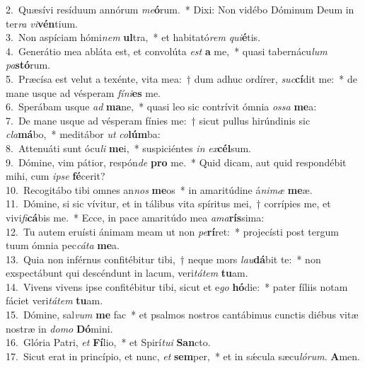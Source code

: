 {2.~}Quæsívi resíduum annórum \textit{me}\textbf{ó}rum.~* Dixi: Non vidébo Dóminum Deum in ter\textit{ra} \textit{vi}\textbf{vén}tium.\\
{3.~}Non aspíciam hómi\textit{nem} \textbf{ul}tra,~* et habitató\textit{rem} \textit{qui}\textbf{é}tis.\\
{4.~}Generátio mea abláta est, et convolúta \textit{est} \textbf{a} me,~* quasi tabernácu\textit{lum} \textit{pa}\textbf{stó}rum.\\
{5.~}Præcísa est velut a texénte, vita mea:~† dum adhuc ordírer, \textit{suc}\textbf{cí}dit me:~* de mane usque ad vésperam \textit{fí}\textit{ni}\textbf{es} me.\\
{6.~}Sperábam usque \textit{ad} \textbf{ma}ne,~* quasi leo sic contrívit ómnia \textit{os}\textit{sa} \textbf{me}a:\\
{7.~}De mane usque ad vésperam fínies me:~† sicut pullus hirúndinis sic \textit{cla}\textbf{má}bo,~* meditábor \textit{ut} \textit{co}\textbf{lúm}ba:\\
{8.~}Attenuáti sunt ócu\textit{li} \textbf{me}i,~* suspiciéntes \textit{in} \textit{ex}\textbf{cél}sum.\\
{9.~}Dómine, vim pátior, respón\textit{de} \textbf{pro} me.~* Quid dicam, aut quid respondébit mihi, cum \textit{i}\textit{pse} \textbf{fé}cerit?\\
{10.~}Recogitábo tibi omnes an\textit{nos} \textbf{me}os~* in amaritúdine á\textit{ni}\textit{mæ} \textbf{me}æ.\\
{11.~}Dómine, si sic vívitur, et in tálibus vita spíritus mei,~† corrípies me, et vivi\textit{fi}\textbf{cá}bis me.~* Ecce, in pace amaritúdo mea \textit{a}\textit{ma}\textbf{rís}sima:\\
{12.~}Tu autem eruísti ánimam meam ut non \textit{pe}\textbf{rí}ret:~* projecísti post tergum tuum ómnia pec\textit{cá}\textit{ta} \textbf{me}a.\\
{13.~}Quia non inférnus confitébitur tibi,~† neque mors \textit{lau}\textbf{dá}bit te:~* non exspectábunt qui descéndunt in lacum, veri\textit{tá}\textit{tem} \textbf{tu}am.\\
{14.~}Vivens vivens ipse confitébitur tibi, sicut et e\textit{go} \textbf{hó}die:~* pater fíliis notam fáciet veri\textit{tá}\textit{tem} \textbf{tu}am.\\
{15.~}Dómine, sal\textit{vum} \textbf{me} fac~* et psalmos nostros cantábimus cunctis diébus vitæ nostræ in \textit{do}\textit{mo} \textbf{Dó}mini.\\
{16.~}Glória Patri, \textit{et} \textbf{Fí}lio,~* et Spirí\textit{tu}\textit{i} \textbf{San}cto.\\
{17.~}Sicut erat in princípio, et nunc, \textit{et} \textbf{sem}per,~* et in sǽcula sæcu\textit{ló}\textit{rum}. \textbf{A}men.\\
